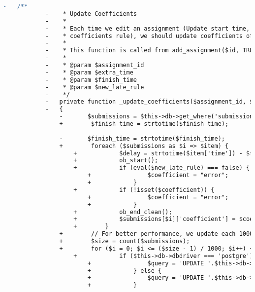 \begin{lstlisting}[language=diff, caption=Perubahan pada kode Assignment\_model.php]
			-	/**
			-	 * Update Coefficients
			-	 *
			-	 * Each time we edit an assignment (Update start time, finish time, extra time, or
			-	 * coefficients rule), we should update coefficients of all submissions of that assignment
			-	 *
			-	 * This function is called from add_assignment($id, TRUE)
			-	 *
			-	 * @param $assignment_id
			-	 * @param $extra_time
			-	 * @param $finish_time
			-	 * @param $new_late_rule
			-	 */
			-	private function _update_coefficients($assignment_id, $extra_time, $finish_time, $new_late_rule)
			-	{
				-		$submissions = $this->db->get_where('submissions', array('assignment'=>$assignment_id))->result_array();
				+        $finish_time = strtotime($finish_time);
				
				-		$finish_time = strtotime($finish_time);
				+        foreach ($submissions as $i => $item) {
					+            $delay = strtotime($item['time']) - $finish_time;
					+            ob_start();
					+            if (eval($new_late_rule) === false) {
						+                $coefficient = "error";
						+            }
					+            if (!isset($coefficient)) {
						+                $coefficient = "error";
						+            }
					+            ob_end_clean();
					+            $submissions[$i]['coefficient'] = $coefficient;
					+        }
				+        // For better performance, we update each 1000 rows in one SQL query
				+        $size = count($submissions);
				+        for ($i = 0; $i <= ($size - 1) / 1000; $i++) {
					+            if ($this->db->dbdriver === 'postgre') {
						+                $query = 'UPDATE '.$this->db->dbprefix('submissions')." AS t SET coefficient = c.coeff FROM (values \n";
						+            } else {
						+                $query = 'UPDATE '.$this->db->dbprefix('submissions')." SET coefficient = CASE\n";
						+            }
					

\end{lstlisting}
